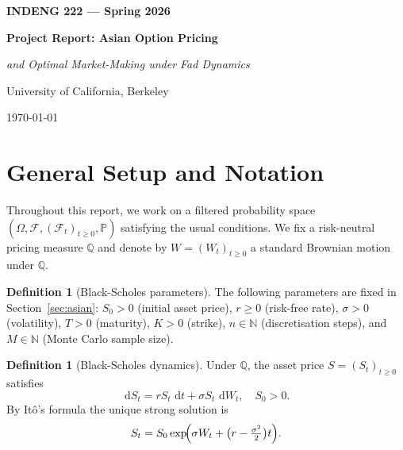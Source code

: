\documentclass[11pt,a4paper]{article}
\theoremstyle{plain}
\theoremstyle{definition}
\newtheorem{definition}[theorem]{Definition}
\newcommand{\Q}{\mathbb{Q}}
\newcommand{\Prob}{\mathbb{P}}
\newcommand{\F}{\mathcal{F}}
\newcommand{\dd}{\,\mathrm{d}}
\begin{document}
\thispagestyle{empty}
\begin{center}
  \vspace*{1cm}
  {\LARGE \textbf{INDENG 222 --- Spring 2026} \par}
  \vspace{0.4cm}
  {\Large \textbf{Project Report: Asian Option Pricing} \par}
  \vspace{0.3cm}
  {\large \textit{and Optimal Market-Making under Fad Dynamics} \par}
  \vspace{1cm}
  {\large University of California, Berkeley \par}
  \vspace{0.2cm}
  {\large \today \par}
  \vspace{0.8cm}
\end{center}

\tableofcontents
\newpage

\section{General Setup and Notation}
\label{sec:setup}

Throughout this report, we work on a filtered probability space
$(\Omega, \F, (\F_t)_{t \ge 0}, \Prob)$ satisfying the usual conditions.
We fix a risk-neutral pricing measure $\Q$ and denote by
$W = (W_t)_{t \ge 0}$ a standard Brownian motion under $\Q$.

\begin{definition}[Black-Scholes parameters]
The following parameters are fixed in Section~\ref{sec:asian}:
$S_0 > 0$ (initial asset price), $r \ge 0$ (risk-free rate),
$\sigma > 0$ (volatility), $T > 0$ (maturity), $K > 0$ (strike),
$n \in \mathbb{N}$ (discretisation steps), and $M \in \mathbb{N}$
(Monte Carlo sample size).
\end{definition}

\begin{definition}[Black-Scholes dynamics]
\label{def:BS}
Under $\Q$, the asset price $S = (S_t)_{t \ge 0}$ satisfies
\begin{equation}
  \dd S_t = r S_t \, \dd t + \sigma S_t \, \dd W_t, \quad S_0 > 0.
\end{equation}
By It\^{o}'s formula the unique strong solution is
\begin{equation}
  S_t = S_0 \exp\!\Bigl(\sigma W_t + \bigl(r - \tfrac{\sigma^2}{2}\bigr)t\Bigr).
\end{equation}
\end{definition}
\end{document}
